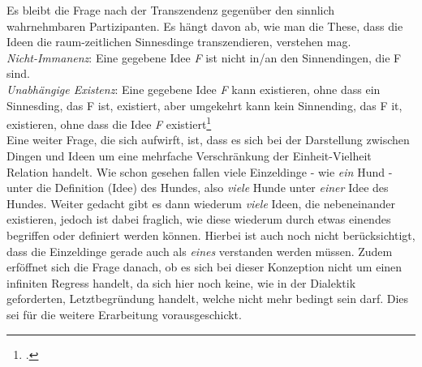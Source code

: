 Es bleibt die Frage nach der Transzendenz gegenüber den sinnlich wahrnehmbaren Partizipanten. Es hängt davon ab, wie man die These, dass die Ideen die raum-zeitlichen Sinnesdinge transzendieren, verstehen mag.\\
\emph{Nicht-Immanenz}: Eine gegebene Idee \emph{F} ist nicht in/an den Sinnendingen, die F sind.\\
\emph{Unabhängige Existenz}: Eine gegebene Idee \emph{F} kann existieren, ohne dass ein Sinnesding, das F ist, existiert, aber umgekehrt kann kein Sinnending, das F it, existieren, ohne dass die Idee \emph{F} existiert\footcite[][S.348]{StrobelTranszendenz}\\
Eine weiter Frage, die sich aufwirft, ist, dass es sich bei der Darstellung zwischen Dingen und Ideen um eine mehrfache Verschränkung der Einheit-Vielheit Relation handelt. Wie schon gesehen fallen viele Einzeldinge - wie \emph{ein} Hund - unter die Definition (Idee) des Hundes, also \emph{viele} Hunde unter \emph{einer} Idee des Hundes. Weiter gedacht gibt es dann wiederum \emph{viele} Ideen, die nebeneinander existieren, jedoch ist dabei fraglich, wie diese wiederum durch etwas einendes begriffen oder definiert werden können. Hierbei ist auch noch nicht berücksichtigt, dass die Einzeldinge gerade auch als \emph{eines} verstanden werden müssen. Zudem erföffnet sich die Frage danach, ob es sich bei dieser Konzeption nicht um einen infiniten Regress handelt, da sich hier noch keine, wie in der Dialektik geforderten, Letztbegründung handelt, welche nicht mehr bedingt sein darf. Dies sei für die weitere Erarbeitung vorausgeschickt.


